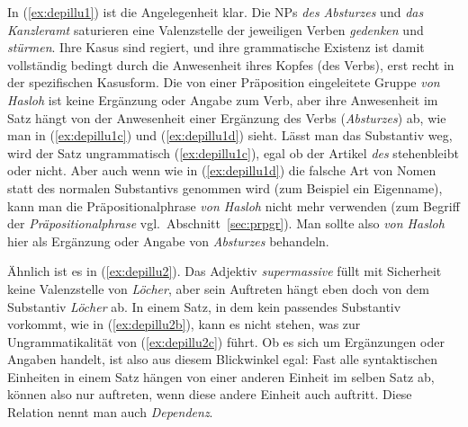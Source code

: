 \begin{exe}
  \ex\label{ex:depillu1}
  \begin{xlist}
  \end{xlist}
  \ex\label{ex:depillu2}
  \begin{xlist}
  \end{xlist}
\end{exe}


In (\ref{ex:depillu1}) ist die Angelegenheit klar.
Die NPs \textit{des Absturzes} und \textit{das Kanzleramt} saturieren eine Valenzstelle der jeweiligen Verben \textit{gedenken} und \textit{stürmen}.
Ihre Kasus sind regiert, und ihre grammatische Existenz ist damit vollständig bedingt durch die Anwesenheit ihres Kopfes (des Verbs), erst recht in der spezifischen Kasusform.
Die von einer Präposition eingeleitete Gruppe \textit{von Hasloh} ist keine Ergänzung oder Angabe zum Verb, aber ihre Anwesenheit im Satz hängt von der Anwesenheit einer Ergänzung des Verbs (\textit{Absturzes}) ab, wie man in (\ref{ex:depillu1c}) und (\ref{ex:depillu1d}) sieht.
Lässt man das Substantiv weg, wird der Satz ungrammatisch (\ref{ex:depillu1c}), egal ob der Artikel \textit{des} stehenbleibt oder nicht.
Aber auch wenn wie in (\ref{ex:depillu1d}) die falsche Art von Nomen statt des normalen Substantivs genommen wird (zum Beispiel ein Eigenname), kann man die Präpositionalphrase \textit{von Hasloh} nicht mehr verwenden (zum Begriff der \textit{Präpositionalphrase} vgl.\ Abschnitt~\ref{sec:prpgr}).
Man sollte also \textit{von Hasloh} hier als Ergänzung oder Angabe von \textit{Absturzes} behandeln.

Ähnlich ist es in (\ref{ex:depillu2}).
Das Adjektiv \textit{supermassive} füllt mit Sicherheit keine Valenzstelle von \textit{Löcher}, aber sein Auftreten hängt eben doch von dem Substantiv \textit{Löcher} ab.
In einem Satz, in dem kein passendes Substantiv vorkommt, wie in (\ref{ex:depillu2b}), kann es nicht stehen, was zur Ungrammatikalität von (\ref{ex:depillu2c}) führt.
Ob es sich um Ergänzungen oder Angaben handelt, ist also aus diesem Blickwinkel egal:
Fast alle syntaktischen Einheiten in einem Satz hängen von einer anderen Einheit im selben Satz ab, können also nur auftreten, wenn diese andere Einheit auch auftritt.
Diese Relation nennt man auch \textit{Dependenz}.

